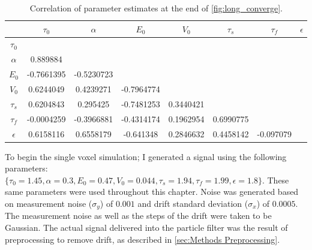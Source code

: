 \begin{table}[t]
\begin{tabular}{|c | c  c  c  c  c  c  c |}
\hline
  & $\tau_0$ & $\alpha$ & $E_0$    & $V_0$    & $\tau_s$ & $\tau_f$ & $\epsilon$ \\
\hline
\rowcolor[gray]{.8} $\tau_0$  & & & & & & & \\
$\alpha$                      & 0.889884 & & & & & & \\
\rowcolor[gray]{.8} $E_0$     & -0.7661395 & -0.5230723 & & & & & \\
$V_0$                         & 0.6244049 & 0.4239271 & -0.7964774 & & & & \\
\rowcolor[gray]{.8} $\tau_s$  & 0.6204843 & 0.295425 & -0.7481253 & 0.3440421 & & & \\
$\tau_f$                      & -0.0004259 & -0.3966881 & -0.4314174 & 0.1962954 & 0.6990775 & & \\
\rowcolor[gray]{.8} $\epsilon$& 0.6158116 & 0.6558179 & -0.641348 & 0.2846632 & 0.4458142 & -0.097079 & \\
\hline
\end{tabular}
\caption{Correlation of parameter estimates at the end of \autoref{fig:long_converge}.}
\label{tab:long_corr}
\end{table}

To begin the single voxel simulation; I generated a signal using the following parameters:
$\{\tau_0 = 1.45, \alpha = 0.3, E_0 = 0.47, V_0 = 0.044, \tau_s = 1.94, \tau_f = 1.99, \epsilon = 1.8\}$.
These same parameters were used throughout this chapter. Noise
was generated based on measurement noise ($\sigma_y$) of $0.001$ and drift standard deviation
($\sigma_x$) of $0.0005$. The measurement noise as well as the steps of the drift
were taken to be Gaussian. The actual signal delivered into the particle filter
was the result of preprocessing to remove drift, as described in
\autoref{sec:Methods Preprocessing}.

